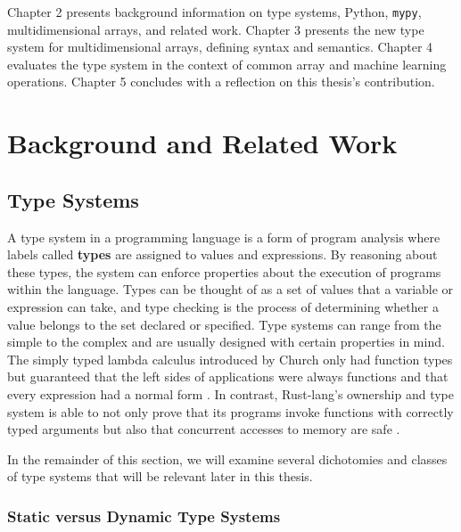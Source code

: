 \documentclass[12pt]{report}
\begin{document}
Chapter 2 presents background information on type systems, Python, \texttt{mypy}, multidimensional arrays, and related work. Chapter 3 presents the new type system for multidimensional arrays, defining syntax and semantics. Chapter 4 evaluates the type system in the context of common array and machine learning operations. Chapter 5 concludes with a reflection on this thesis's contribution.

\chapter{Background and Related Work}

\section{Type Systems}

A type system in a programming language is a form of program analysis where labels called \textbf{types} are assigned to values and expressions. By reasoning about these types, the system can enforce properties about the execution of programs within the language. Types can be thought of as a set of values that a variable or expression can take, and type checking is the process of determining whether a value belongs to the set declared or specified. Type systems can range from the simple to the complex and are usually designed with certain properties in mind. The simply typed lambda calculus introduced by Church only had function types but guaranteed that the left sides of applications were always functions and that every expression had a normal form \cite{Church1940AFO}. In contrast, Rust-lang's ownership and type system is able to not only prove that its programs invoke functions with correctly typed arguments but also that concurrent accesses to memory are safe \cite{rustlang}.

In the remainder of this section, we will examine several dichotomies and classes of type systems that will be relevant later in this thesis.

\subsection{Static versus Dynamic Type Systems}
\end{document}
